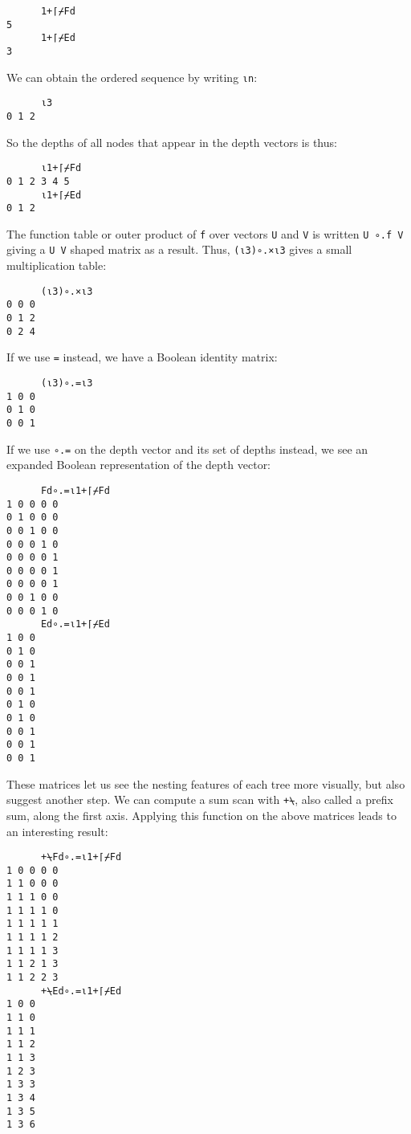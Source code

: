 \documentclass[numbers,preprint]{sigplanconf}
\begin{document}
\begin{verbatim}
      1+⌈⌿Fd
5
      1+⌈⌿Ed
3
\end{verbatim}

\noindent
We can obtain the ordered sequence  by writing \verb;⍳n;:

\begin{verbatim}
      ⍳3
0 1 2
\end{verbatim}

\noindent
So the depths of all nodes that appear in the depth vectors is thus:

\begin{verbatim}
      ⍳1+⌈⌿Fd
0 1 2 3 4 5
      ⍳1+⌈⌿Ed
0 1 2
\end{verbatim}

\noindent
The function table or outer product of \verb;f; over vectors \verb;U; and \verb;V; is
written \verb;U ∘.f V; giving a \verb;U V; shaped matrix as a result. Thus,
\verb;(⍳3)∘.×⍳3; gives a small multiplication table:

\begin{verbatim}
      (⍳3)∘.×⍳3
0 0 0
0 1 2
0 2 4
\end{verbatim}

\noindent
If we use \verb;=; instead, we have a Boolean identity matrix:

\begin{verbatim}
      (⍳3)∘.=⍳3
1 0 0
0 1 0
0 0 1
\end{verbatim}

\noindent
If we use \verb;∘.=; on the depth vector and its set of depths instead,
we see an expanded Boolean representation of the depth vector:

\begin{verbatim}
      Fd∘.=⍳1+⌈⌿Fd
1 0 0 0 0
0 1 0 0 0
0 0 1 0 0
0 0 0 1 0
0 0 0 0 1
0 0 0 0 1
0 0 0 0 1
0 0 1 0 0
0 0 0 1 0
      Ed∘.=⍳1+⌈⌿Ed
1 0 0
0 1 0
0 0 1
0 0 1
0 0 1
0 1 0
0 1 0
0 0 1
0 0 1
0 0 1
\end{verbatim}

\noindent
These matrices let us see the nesting features of each tree more
visually, but also suggest another step. We can compute a sum scan
with \verb;+⍀;, also called a prefix sum, along the first axis. Applying
this function on the above matrices leads to an interesting result:

\begin{verbatim}
      +⍀Fd∘.=⍳1+⌈⌿Fd
1 0 0 0 0
1 1 0 0 0
1 1 1 0 0
1 1 1 1 0
1 1 1 1 1
1 1 1 1 2
1 1 1 1 3
1 1 2 1 3
1 1 2 2 3
      +⍀Ed∘.=⍳1+⌈⌿Ed
1 0 0
1 1 0
1 1 1
1 1 2
1 1 3
1 2 3
1 3 3
1 3 4
1 3 5
1 3 6
\end{verbatim}
\end{document}
